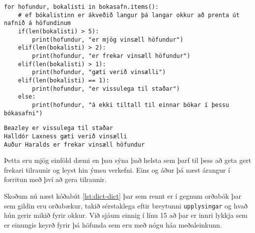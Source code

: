 \begin{lstlisting}[caption=Ítrun í gegnum orðabækur með .items(), label=lst:dict-bokasafn3]
for hofundur, bokalisti in bokasafn.items():
	# ef bókalistinn er ákveðið langur þá langar okkur að prenta út nafnið á höfundinum
	if(len(bokalisti) > 5):
		print(hofundur, "er mjög vinsæll höfundur")
	elif(len(bokalisti) > 2):
		print(hofundur, "er frekar vinsæll höfundur")
	elif(len(bokalisti) > 1):
		print(hofundur, "gæti verið vinsælli")
	elif(len(bokalisti) == 1):
		print(hofundur, "er vissulega til staðar")
	else:
		print(hofundur, "á ekki tiltall til einnar bókar í þessu bókasafni")
\end{lstlisting}
\lstset{style=uttak}
\begin{lstlisting}
Beazley er vissulega til staðar
Halldór Laxness gæti verið vinsælli
Auður Haralds er frekar vinsæll höfundur
\end{lstlisting}
\lstset{style=venjulegt}

Þetta eru mjög einföld dæmi en þau sýna það helsta sem þarf til þess að geta gert frekari tilraunir og leyst hin ýmsu verkefni.
Eins og áður þá næst árangur í forritun með því að gera tilraunir.

Skoðum nú næst kóðabút \ref{lst:dict-dict} þar sem rennt er í gegnum orðabók þar sem gildin eru orðabækur, takið sérstaklega eftir breytunni \texttt{upplysingar} og hvað hún gerir mikið fyrir okkur.
Við sjáum einnig í línu 15 að þar er innri lykkja sem er einungis keyrð fyrir þá höfunda sem eru með nógu háa meðaleinkunn.

